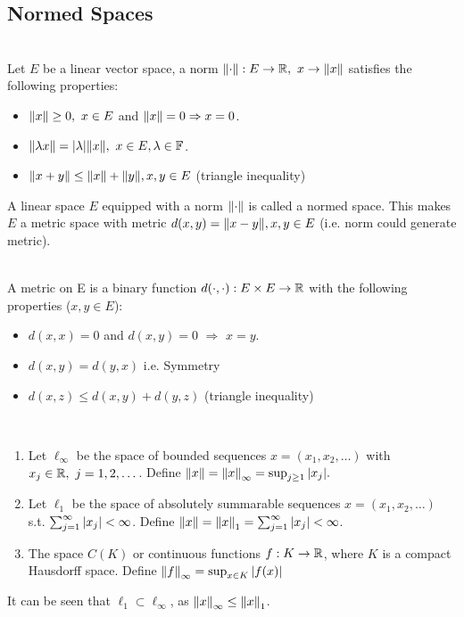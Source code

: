 \subsection{Normed Spaces}
\begin{definition}\ \\
Let $E$ be a linear vector space, a norm $\norm{\cdot}: E \to \mathbb{R},\ x \to \norm{x}$ satisfies the following properties:
\begin{itemize}
    \item $\norm{x} \geq 0,\ x \in E$ and $\norm{x} = 0 \Rightarrow x = 0$.
    \item $\norm{\lambda x} = \abs{\lambda} \norm{x},\ x \in E, \lambda \in \mathbb{F}$.
    \item $\norm{x + y} \leq \norm{x} + \norm{y}, x,y \in E$ (triangle inequality) 
\end{itemize}
\end{definition}
\np A linear space $E$ equipped with a norm $\norm{\cdot}$ is called a normed space. This makes $E$ a metric space with metric $d(x,y) = \norm{x -y}, x,y \in E$ (i.e. norm could generate metric).

\vspace{3pt}
\begin{definition}\ \\
A metric on E is a binary function $d(\cdot, \cdot): E \times E \to \mathbb{R}$ with the following properties ($x,y \in E$):
\begin{itemize}
    \item $d(x,x) = 0$ and $d(x,y) = 0$ $\Rightarrow$ $x = y$.
    \item $d(x,y) = d(y,x)$ i.e. Symmetry
    \item $d(x,z) \leq d(x,y) + d(y,z)$ (triangle inequality)
\end{itemize}
\end{definition}
\begin{examples}\ 
\begin{enumerate}[label = (\alph*)]
    \item Let $\ell_\infty$ be the space of bounded sequences $x = (x_1,x_2,\dots)$ with $x_j \in \mathbb{R},\ j = 1,2,\dots$. Define $\norm{x} = \norm{x}_\infty = \sup_{j \geq 1} \abs{x_j}.$
    \item Let $\ell_1$ be the space of absolutely summarable sequences $x = (x_1,x_2,\dots)$ s.t. $\sum_{j=1}^\infty \abs{x_j} < \infty$. Define $\norm{x} = \norm{x}_1 = \sum_{j = 1}^\infty \abs{x_j} < \infty$.
    \item The space $C(K)$ or continuous functions $f: K \to \mathbb{R}$, where $K$ is a compact Hausdorff space. Define $\norm{f}_\infty = \sup_{x \in K} \abs{f(x)}$
\end{enumerate}
It can be seen that $\ell_1 \subset \ell_\infty$, as $\norm{x}_\infty \leq \norm{x}_1$.
\end{examples}

